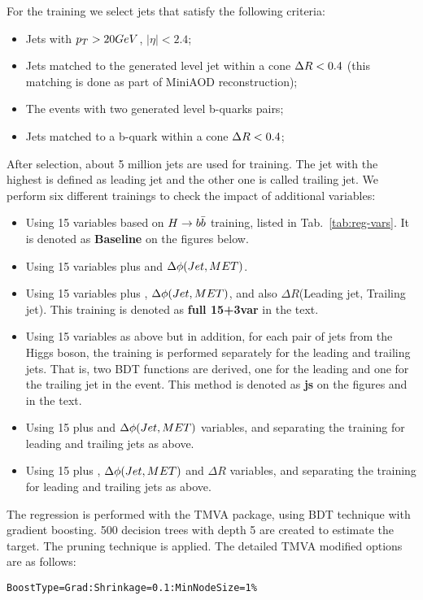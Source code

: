 For the training we select jets that satisfy the following criteria:
\begin{itemize}
\item Jets with $p_{T} > 20GeV$, $|\eta| < 2.4$;
\item Jets matched to the generated level jet within a cone $\Delta R<0.4$ (this matching is done as part of MiniAOD reconstruction);
\item The events with two generated level \Hbb b-quarks pairs;
\item Jets matched to a b-quark within a cone $\Delta R<0.4$;
\end{itemize}
After selection, about 5 million jets are used for training.
The jet with the highest \PT is defined as leading jet and the other one is called trailing jet.
We perform six different trainings to check the impact of additional variables:
\begin{itemize}
\item Using 15 variables based on $H\to b\bar{b}$ training, listed in
  Tab.~\ref{tab:reg-vars}. It is denoted as \textbf{Baseline} on the
  figures below.
\item Using 15 variables plus \MET and $\Delta\phi(Jet, MET)$.
\item Using 15 variables plus \MET , $\Delta\phi(Jet, MET)$, and also
  $\Delta R$(Leading jet, Trailing jet).  This training is denoted as
  \textbf{full 15+3var} in the text.
\item Using 15 variables as above but in addition, for each pair of
  jets from the Higgs boson, the training is performed separately for
  the leading and trailing jets. That is, two BDT functions are
  derived, one for the leading and one for the trailing jet in the
  event.  This method is denoted as \textbf{js} on the figures and in
  the text.
\item Using 15 plus \MET and $\Delta\phi(Jet, MET)$ variables, and
  separating the training for leading and trailing jets as above.
\item Using 15 plus \MET, $\Delta\phi(Jet, MET)$ and $\Delta R$
  variables, and separating the training for leading and trailing jets
  as above.
\end{itemize}

The regression is performed with the TMVA package, using BDT technique with gradient boosting. 500 decision trees with depth 5 
are created to estimate the target. The pruning technique is applied.
The detailed TMVA modified options are as follows:

\verb|BoostType=Grad:Shrinkage=0.1:MinNodeSize=1%|

